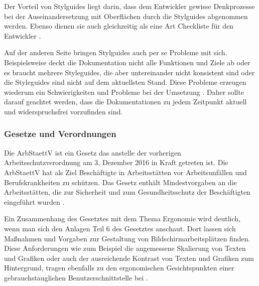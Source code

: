 Der Vorteil von Stylguides liegt darin, dass dem Entwickler gewisse Denkprozesse bei der Auseinandersetzung mit Oberflächen durch die Stylguides abgenommen werden. Ebenso dienen sie auch gleichzeitig als eine Art Checkliste für den Entwickler \citep[vgl.][214]{Thomaschewski2013}.

Auf der anderen Seite bringen Stylguides auch per se Probleme mit sich. Beispielsweise deckt die Dokumentation nicht alle Funktionen und Ziele ab oder es braucht mehrere Styleguides, die aber untereinander nicht konsistent sind oder die Styleguides sind nicht auf dem aktuellsten Stand. Diese Probleme erzeugen wiederum ein Schwierigkeiten und Probleme bei der Umsetzung \citep[vgl.][215]{Thomaschewski2013}. Daher sollte darauf geachtet werden, dass die Dokumentationen zu jedem Zeitpunkt aktuell und widerspruchsfrei vorzufinden sind.


\subsubsection{Gesetze und Verordnungen}

Die \gls{ArbStaettV} ist ein Gesetz das anstelle der vorherigen Arbeitsschutzverordnung am 3. Dezember 2016 in Kraft getreten ist. Die \gls{ArbStaettV} hat als Ziel Beschäftigte in Arbeitsstätten vor Arbeitsunfällen und Berufskrankheiten zu schützen. Das Gesetz enthält Mindestvorgaben an die Arbeitsstätten, die zur Sicherheit und zum Gesundheitsschutz der Beschäftigten eingeführt wurden \citep[vgl.][]{BAuA}. 

Ein Zusammenhang des Gesetztes mit dem Thema Ergonomie wird deutlich, wenn man sich den Anlagen Teil 6 des Gesetztes anschaut. Dort lassen sich Maßnahmen und Vorgaben zur Gestaltung von Bildschirmarbeitsplätzen finden. Diese Anforderungen wie zum Beispiel die angemessene Skalierung von Texten und Grafiken oder auch der ausreichende Kontrast von Texten und Grafiken zum Hintergrund, tragen ebenfalls zu den ergonomischen Gesichtspunkten einer gebrauchstauglichen Benutzerschnittstelle bei \citep[vgl.][Anhang: Kap. 6]{ArbStaettV}.

